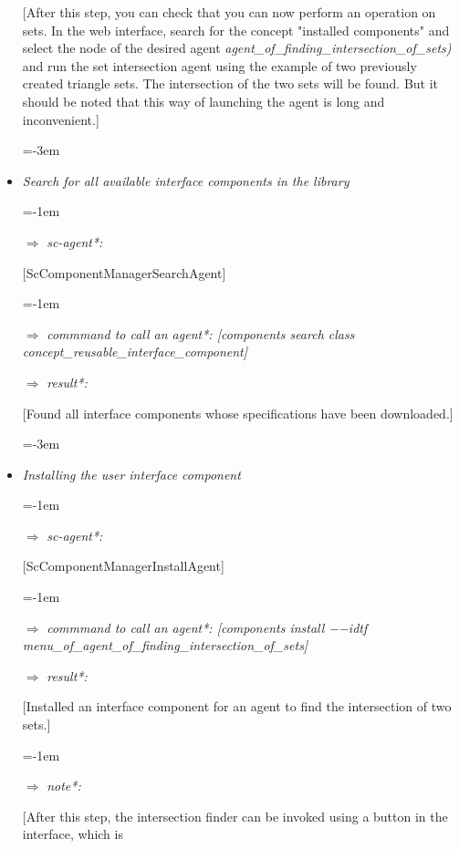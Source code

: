 \documentclass{article}
\begin{document}
\begin{multicols}{2}
\begin{itemize}
\leftskip=0pt
[After this step, you can check
that you can now perform an
operation on sets. In the web
interface, search for the concept
"installed components" and select
the node of the desired agent
\textit{agent\_of\_finding\_intersection\_of\_sets)}
and run the set intersection agent
using the example of two
previously created triangle
sets. The intersection of the
two sets will be found. But it
should be noted that this way of
launching the agent is long and
inconvenient.] \par
\leftskip=-3em
  \item\quad\textit{Search for all available interface
components in the library} \par
\leftskip=0pt


\newpage

\leftskip=-1em
\item[$\Rightarrow$] \quad
\textit{sc-agent*:} \par
\leftskip=0pt
[ScComponentManagerSearchAgent] \par
\leftskip=-1em
\item[$\Rightarrow$] \quad
\textit{commmand to call an agent*:
[components search class concept\_reusable\_interface\_component]}
\item[$\Rightarrow$] \quad
\textit{result*:} \par
\leftskip=0pt
[Found all interface components
whose specifications have been
downloaded.] \par
\leftskip=-3em
\item\textit{Installing the user interface component} \par
\leftskip=-1em
\item[$\Rightarrow$] \quad
\textit{sc-agent*:} \par
\leftskip=0pt
[ScComponentManagerInstallAgent] \par
\leftskip=-1em
\item[$\Rightarrow$] \quad
\textit{commmand to call an agent*:
[components install −−idtf 
menu\_of\_agent\_of\_finding\_intersection\_of\_sets]}
\item[$\Rightarrow$] \quad
\textit{result*:} \par
\leftskip=0pt
[Installed an interface component
for an agent to find the intersection of two sets.] \par
\leftskip=-1em
\item[$\Rightarrow$] \quad
\textit{note*:} \par
\leftskip=0pt
[After this step, the intersection
finder can be invoked using a
button in the interface, which is

\end{itemize}
\end{multicols}
\end{document}
